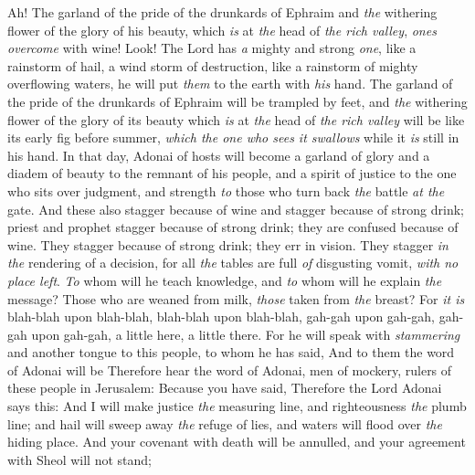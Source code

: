 \begin{biblechapter} %
 Ah! The garland of the pride of the drunkards of Ephraim 
and \textit{the} withering flower of the glory of his beauty, 
which \textit{is} at \textit{the} head of \textit{the rich valley}, 
\textit{ones overcome} with wine!
\verse Look! The Lord has \textit{a} mighty and strong \textit{one}, 
like a rainstorm of hail, a wind storm of destruction, 
like a rainstorm of mighty overflowing waters, 
he will put \textit{them} to the earth with \textit{his} hand.
\verse The garland of the pride of the drunkards of Ephraim 
will be trampled by feet,
\verse and \textit{the} withering flower of the glory of its beauty 
which \textit{is} at \textit{the} head of \textit{the rich valley} 
will be like its early fig before summer, 
\textit{which the one who sees it swallows} while it \textit{is} still in his hand.
\verse In that day, Adonai of hosts will become a garland of glory 
and a diadem of beauty to the remnant of his people,
\verse and a spirit of justice to the one who sits over judgment, 
and strength \textit{to} those who turn back \textit{the} battle \textit{at the} gate.
\verse And these also stagger because of wine 
and stagger because of strong drink; 
priest and prophet stagger because of strong drink; 
they are confused because of wine. 
They stagger because of strong drink; 
they err in vision. 
They stagger \textit{in the} rendering of a decision,
\verse for all \textit{the} tables are full \textit{of} disgusting vomit, \textit{with no place left}.
\verse \textit{To} whom will he teach knowledge, 
and \textit{to} whom will he explain \textit{the} message? 
Those who are weaned from milk, 
\textit{those} taken from \textit{the} breast?
\verse For \textit{it is} blah-blah upon blah-blah, 
blah-blah upon blah-blah, 
gah-gah upon gah-gah, 
gah-gah upon gah-gah, 
a little here, a little there.
\verse For he will speak with \textit{stammering} and another tongue to this people,
\verse to whom he has said,
\verse And to them the word of Adonai will be
 Therefore hear the word of Adonai, men of mockery, 
rulers of these people in Jerusalem:
\verse Because you have said,
\verse Therefore the Lord Adonai says this:
\verse And I will make justice \textit{the} measuring line, 
and righteousness \textit{the} plumb line; 
and hail will sweep away \textit{the} refuge of lies, 
and waters will flood over \textit{the} hiding place.
\verse And your covenant with death will be annulled, 
and your agreement with Sheol will not stand; 

\end{biblechapter}
